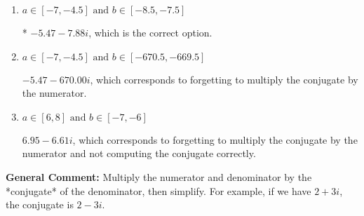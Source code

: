 \documentclass{extbook}[14pt]
\begin{document}
\begin{enumerate}
{\begin{enumerate}[label=\Alph*.]
 $-465.00  - 7.88 i$, which corresponds to forgetting to multiply the conjugate by the numerator and using a plus instead of a minus in the denominator.
\item \( a \in [-7, -4.5] \text{ and } b \in [-8.5, -7.5] \)

* $-5.47  - 7.88 i$, which is the correct option.
\item \( a \in [-7, -4.5] \text{ and } b \in [-670.5, -669.5] \)

 $-5.47  - 670.00 i$, which corresponds to forgetting to multiply the conjugate by the numerator.
\item \( a \in [6, 8] \text{ and } b \in [-7, -6] \)

 $6.95  - 6.61 i$, which corresponds to forgetting to multiply the conjugate by the numerator and not computing the conjugate correctly.
\end{enumerate}

\textbf{General Comment:} Multiply the numerator and denominator by the *conjugate* of the denominator, then simplify. For example, if we have $2+3i$, the conjugate is $2-3i$.
}
\end{enumerate}
\end{document}
